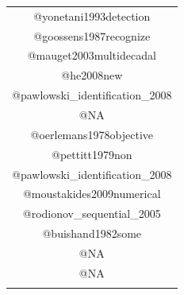 \documentclass[12pt,twoside,openany]{reedthesis}
\begin{document}
\begin{longtable}[]{@{}c@{}}
\begin{minipage}[t]{0.46\columnwidth}\centering
@yonetani1993detection\strut
\end{minipage}\tabularnewline
\begin{minipage}[t]{0.46\columnwidth}\centering
@goossens1987recognize\strut
\end{minipage}\tabularnewline
\begin{minipage}[t]{0.46\columnwidth}\centering
@mauget2003multidecadal\strut
\end{minipage}\tabularnewline
\begin{minipage}[t]{0.46\columnwidth}\centering
@he2008new\strut
\end{minipage}\tabularnewline
\begin{minipage}[t]{0.46\columnwidth}\centering
@pawlowski\_identification\_2008\strut
\end{minipage}\tabularnewline
\begin{minipage}[t]{0.46\columnwidth}\centering
@NA\strut
\end{minipage}\tabularnewline
\begin{minipage}[t]{0.46\columnwidth}\centering
@oerlemans1978objective\strut
\end{minipage}\tabularnewline
\begin{minipage}[t]{0.46\columnwidth}\centering
@pettitt1979non\strut
\end{minipage}\tabularnewline
\begin{minipage}[t]{0.46\columnwidth}\centering
@pawlowski\_identification\_2008\strut
\end{minipage}\tabularnewline
\begin{minipage}[t]{0.46\columnwidth}\centering
@moustakides2009numerical\strut
\end{minipage}\tabularnewline
\begin{minipage}[t]{0.46\columnwidth}\centering
@rodionov\_sequential\_2005\strut
\end{minipage}\tabularnewline
\begin{minipage}[t]{0.46\columnwidth}\centering
@buishand1982some\strut
\end{minipage}\tabularnewline
\begin{minipage}[t]{0.46\columnwidth}\centering
@NA\strut
\end{minipage}\tabularnewline
\begin{minipage}[t]{0.46\columnwidth}\centering
@NA\strut
\end{minipage}\tabularnewline
\begin{minipage}[t]{0.46\columnwidth}\centering

\end{minipage}
\end{longtable}
\end{document}
